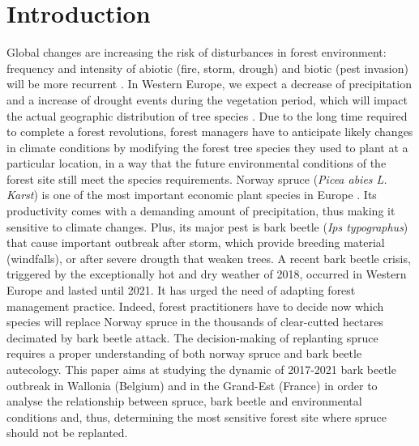 \documentclass[3p,procedia]{elsarticle}
\begin{document}
\linenumbers

\section{Introduction}

Global changes are increasing the risk of disturbances in forest environment: frequency and intensity of abiotic (fire, storm, drough) and biotic (pest invasion) will be more recurrent \citep{lindner_climate_2010}.
In Western Europe, we expect a decrease of precipitation and a increase of drought events during the vegetation period, which will impact the actual geographic distribution of tree species \citep{hanewinkel2013climate}.
Due to the long time required to complete a forest revolutions, forest managers have to anticipate likely changes in climate conditions by modifying the forest tree species they used to plant at a particular location, in a way that the future environmental conditions of the forest site still meet the species requirements.
Norway spruce (\textit{Picea abies L. Karst}) is one of the most important economic plant species in Europe \citep{nystedt_norway_2013}.
Its productivity comes with a demanding amount of precipitation, thus making it sensitive to climate changes.
Plus, its major pest is bark beetle (\textit{Ips typographus}) that cause important outbreak after storm, which provide breeding material (windfalls), or after severe drougth that weaken trees.
A recent bark beetle crisis, triggered by the exceptionally hot and dry weather of 2018, occurred in Western Europe and lasted until 2021. 
It has urged the need of adapting forest management practice. 
Indeed, forest practitioners have to decide now which species will replace Norway spruce in the thousands of clear-cutted hectares decimated by bark beetle attack. 
The decision-making of replanting spruce requires a proper understanding of both norway spruce and bark beetle autecology.
This paper aims at studying the dynamic of 2017-2021 bark beetle outbreak in Wallonia (Belgium) and in the Grand-Est (France) in order to analyse the relationship between spruce, bark beetle and environmental conditions and, thus, determining the most sensitive forest site where spruce should not be replanted.
\end{document}
